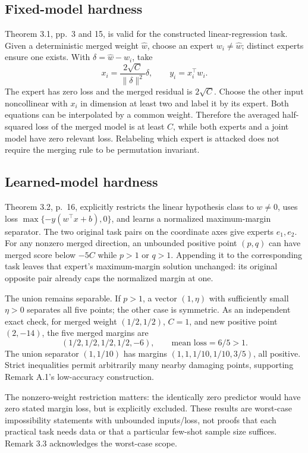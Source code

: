 \documentclass[10pt]{article}
\begin{document}
\subsection*{Fixed-model hardness}
Theorem 3.1, pp. 3 and 15, is valid for the constructed linear-regression task. Given a deterministic merged weight \(\widehat w\), choose an expert \(w_i\ne\widehat w\); distinct experts ensure one exists. With \(\delta=\widehat w-w_i\), take \[x_i=\frac{2\sqrt C}{\|\delta\|^2}\delta,\qquad y_i=x_i^\top w_i.\] The expert has zero loss and the merged residual is \(2\sqrt C\). Choose the other input noncollinear with \(x_i\) in dimension at least two and label it by its expert. Both equations can be interpolated by a common weight. Therefore the averaged half-squared loss of the merged model is at least \(C\), while both experts and a joint model have zero relevant loss. Relabeling which expert is attacked does not require the merging rule to be permutation invariant.\par
\subsection*{Learned-model hardness}
Theorem 3.2, p. 16, explicitly restricts the linear hypothesis class to \(w\ne0\), uses loss \(\max\{-y(w^\top x+b),0\}\), and learns a normalized maximum-margin separator. The two original task pairs on the coordinate axes give experts \(e_1,e_2\). For any nonzero merged direction, an unbounded positive point \((p,q)\) can have merged score below \(-5C\) while \(p>1\) or \(q>1\). Appending it to the corresponding task leaves that expert’s maximum-margin solution unchanged: its original opposite pair already caps the normalized margin at one.\par
The union remains separable. If \(p>1\), a vector \((1,\eta)\) with sufficiently small \(\eta>0\) separates all five points; the other case is symmetric. As an independent exact check, for merged weight \((1/2,1/2)\), \(C=1\), and new positive point \((2,-14)\), the five merged margins are \[(1/2,1/2,1/2,1/2,-6),\qquad \text{mean loss}=6/5>1.\] The union separator \((1,1/10)\) has margins \((1,1,1/10,1/10,3/5)\), all positive. Strict inequalities permit arbitrarily many nearby damaging points, supporting Remark A.1’s low-accuracy construction.\par
The nonzero-weight restriction matters: the identically zero predictor would have zero stated margin loss, but is explicitly excluded. These results are worst-case impossibility statements with unbounded inputs/loss, not proofs that each practical task needs data or that a particular few-shot sample size suffices. Remark 3.3 acknowledges the worst-case scope.\par
\end{document}
